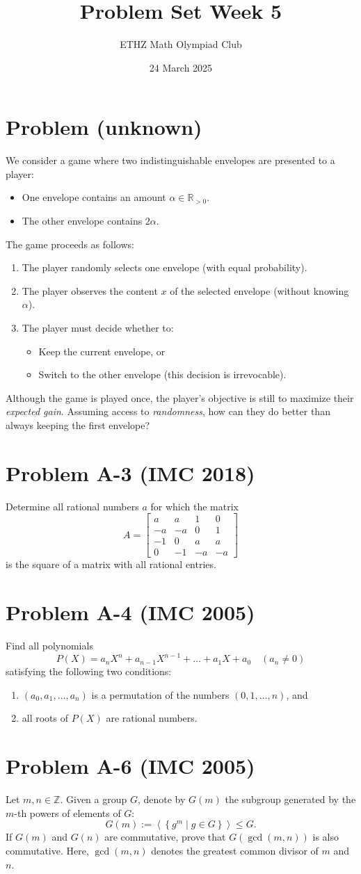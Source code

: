 \documentclass[11pt, a4paper, oneside]{article}
\title{Problem Set Week 5}
\author{ETHZ Math Olympiad Club}
\date{24 March 2025}
\newcommand{\problem}[1][]{\section{#1} \hfill \par}
\theoremstyle{remark}
\begin{document}
\maketitle
\problem[Problem (unknown)]
We consider a game where two indistinguishable envelopes are presented to a player:
\begin{itemize}
    \item One envelope contains an amount $\alpha \in \mathbb{R}_{>0}$.
    \item The other envelope contains $2\alpha$.
\end{itemize}

The game proceeds as follows:
\begin{enumerate}
    \item The player randomly selects one envelope (with equal probability).
    \item The player observes the content $x$ of the selected envelope (without knowing $\alpha$).
    \item The player must decide whether to:
    \begin{itemize}
        \item Keep the current envelope, or
        \item Switch to the other envelope (this decision is irrevocable).
    \end{itemize}
\end{enumerate}
Although the game is played once, the player's objective is still to maximize their \textit{expected gain}. Assuming access to \textit{randomness}, how can they do better than always keeping the first envelope?

\problem[Problem A-3 (IMC 2018)]
Determine all rational numbers $a$ for which the matrix
\[
A = \begin{bmatrix}
    a & a & 1 & 0 \\
    -a & -a & 0 & 1 \\
    -1 & 0 & a & a \\
    0 & -1 & -a & -a
\end{bmatrix}
\]
is the square of a matrix with all rational entries.

\problem[Problem A-4 (IMC 2005)]
Find all polynomials
\[
P(X) = a_n X^n + a_{n-1} X^{n-1} + \dots + a_1 X + a_0 \quad (a_n \neq 0)
\]
satisfying the following two conditions:

\begin{enumerate}
    \item \( (a_0, a_1, \dots, a_n) \) is a permutation of the numbers \( (0, 1, \dots, n) \), and
    \item all roots of \( P(X) \) are rational numbers.
\end{enumerate}

\problem[Problem A-6 (IMC 2005)]
Let $m,n\in\mathbb{Z}$. Given a group \( G \), denote by \( G(m) \) the subgroup generated by the \( m \)-th powers of elements of \( G \):
\[
G(m):=\left\langle\left\{g^m \mid g\in G\right\}\right\rangle\leq G.
\]
If \( G(m) \) and \( G(n) \) are commutative, prove that \( G(\gcd(m, n)) \) is also commutative. Here, \( \gcd(m, n) \) denotes the greatest common divisor of \( m \) and \( n \).
\end{document}
